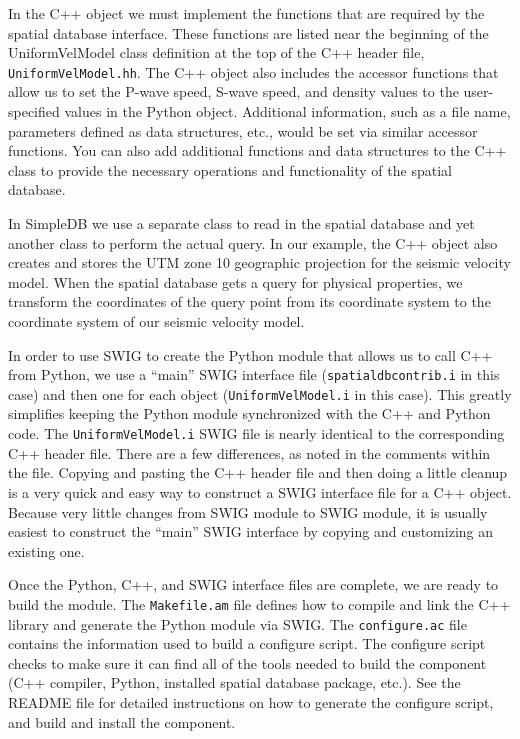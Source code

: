 In the C++ object we must implement the functions that are required
by the spatial database interface. These functions are listed near
the beginning of the UniformVelModel class definition at the top of
the C++ header file, \texttt{UniformVelModel.hh}. The C++ object also
includes the accessor functions that allow us to set the P-wave speed,
S-wave speed, and density values to the user-specified values in the
Python object. Additional information, such as a file name, parameters
defined as data structures, etc., would be set via similar accessor
functions. You can also add additional functions and data structures
to the C++ class to provide the necessary operations and functionality
of the spatial database. 

In SimpleDB we use a separate class to read in the spatial database
and yet another class to perform the actual query. In our example,
the C++ object also creates and stores the UTM zone 10 geographic
projection for the seismic velocity model. When the spatial database
gets a query for physical properties, we transform the coordinates
of the query point from its coordinate system to the coordinate system
of our seismic velocity model.

In order to use SWIG to create the Python module that allows us to
call C++ from Python, we use a ``main'' SWIG interface file (\texttt{\small{}spatialdbcontrib.i}
in this case) and then one for each object (\texttt{\small{}UniformVelModel.i}
in this case). This greatly simplifies keeping the Python module synchronized
with the C++ and Python code. The \texttt{\small{}UniformVelModel.i}
SWIG file is nearly identical to the corresponding C++ header file.
There are a few differences, as noted in the comments within the file.
Copying and pasting the C++ header file and then doing a little cleanup
is a very quick and easy way to construct a SWIG interface file for
a C++ object. Because very little changes from SWIG module to SWIG
module, it is usually easiest to construct the ``main'' SWIG interface
by copying and customizing an existing one.

Once the Python, C++, and SWIG interface files are complete, we are
ready to build the module. The \texttt{Makefile.am} file defines how
to compile and link the C++ library and generate the Python module
via SWIG. The \texttt{configure.ac} file contains the information
used to build a configure script. The configure script checks to make
sure it can find all of the tools needed to build the component (C++
compiler, Python, installed spatial database package, etc.). See the
README file for detailed instructions on how to generate the configure
script, and build and install the component.

